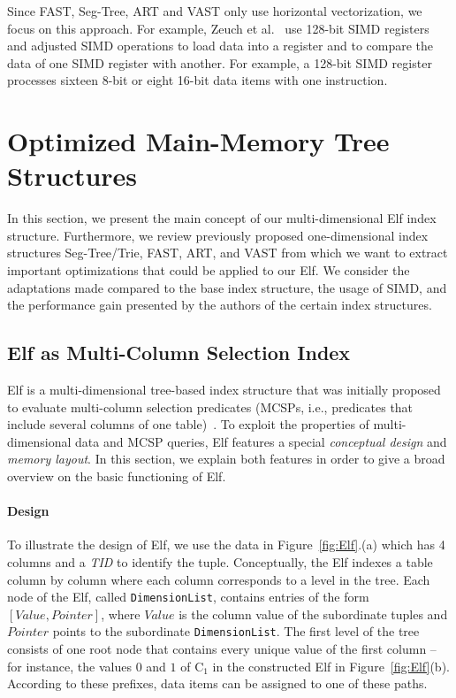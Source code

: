 \documentclass[runningheads,a4paper]{llncs}
\begin{document}
Since FAST, Seg-Tree, ART and VAST only use horizontal vectorization, we focus on this approach.  For example, Zeuch et al.\ \cite{zeuch2014adapting} use 128-bit SIMD registers and adjusted SIMD operations to load data into a register and to compare the data of one SIMD register with another. For example, a 128-bit SIMD register processes sixteen 8-bit or eight 16-bit data items with one instruction. %


\section{Optimized Main-Memory Tree Structures}
In this section, we present the main concept of our multi-dimensional Elf index structure. Furthermore, we review previously proposed one-dimensional index structures Seg-Tree/Trie, FAST, ART, and VAST from which we want to extract important optimizations that could be applied to our Elf. We consider the adaptations made compared to the base index structure, the usage of SIMD, and the performance gain presented by the authors of the certain index structures.


\subsection{Elf as Multi-Column Selection Index}\label{elf}

Elf is a multi-dimensional tree-based index structure that was initially proposed to evaluate multi-column selection predicates (MCSPs, i.e., predicates that include several columns of one table)~\cite{BKS+17}. To exploit the properties of multi-dimensional data and MCSP queries, Elf features a special \textit{conceptual design} and \textit{memory layout}. In this section, we explain both features in order to give a broad overview on the basic functioning of Elf.



\paragraph{Design}
To illustrate the design of Elf, we use the data in Figure~\ref{fig:Elf}.(a) which has 4 columns and a \textit{TID} to identify the tuple. 
Conceptually, the Elf indexes a table column by column where each column corresponds to a level in the tree. Each node of the Elf, called \verb.DimensionList., contains entries of the form $[Value, Pointer]$, where $Value$ is the column value of the subordinate tuples and $Pointer$ points to the subordinate \verb.DimensionList.. The first level of the tree consists of one root node that contains every unique value of the first column -- for instance, the values $0$ and $1$ of C$_{1}$ in the constructed Elf in Figure~\ref{fig:Elf}(b).  According to these prefixes, data items can be assigned to one of these paths. 
\end{document}
